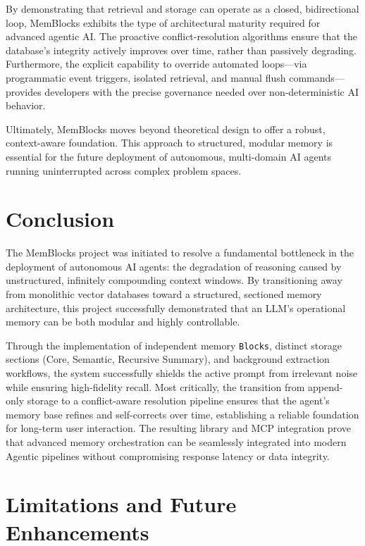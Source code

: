 \documentclass[12pt,a4paper]{article}
\begin{document}
By demonstrating that retrieval and storage can operate as a closed, bidirectional loop, MemBlocks exhibits the type of architectural maturity required for advanced agentic AI. The proactive conflict-resolution algorithms ensure that the database's integrity actively improves over time, rather than passively degrading. Furthermore, the explicit capability to override automated loops---via programmatic event triggers, isolated retrieval, and manual flush commands---provides developers with the precise governance needed over non-deterministic AI behavior. 

Ultimately, MemBlocks moves beyond theoretical design to offer a robust, context-aware foundation. This approach to structured, modular memory is essential for the future deployment of autonomous, multi-domain AI agents running uninterrupted across complex problem spaces.

\section{Conclusion}

The MemBlocks project was initiated to resolve a fundamental bottleneck in the deployment of autonomous AI agents: the degradation of reasoning caused by unstructured, infinitely compounding context windows. By transitioning away from monolithic vector databases toward a structured, sectioned memory architecture, this project successfully demonstrated that an LLM's operational memory can be both modular and highly controllable.

Through the implementation of independent memory \texttt{Blocks}, distinct storage sections (Core, Semantic, Recursive Summary), and background extraction workflows, the system successfully shields the active prompt from irrelevant noise while ensuring high-fidelity recall. Most critically, the transition from append-only storage to a conflict-aware resolution pipeline ensures that the agent's memory base refines and self-corrects over time, establishing a reliable foundation for long-term user interaction. The resulting library and MCP integration prove that advanced memory orchestration can be seamlessly integrated into modern Agentic pipelines without compromising response latency or data integrity.

\section{Limitations and Future Enhancements}
\end{document}
